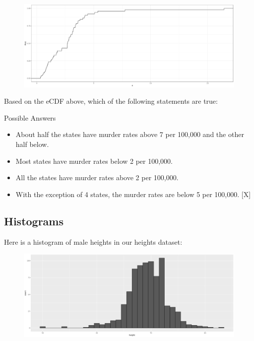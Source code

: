 \documentclass[]{article}
\providecommand{\tightlist}{%
  \setlength{\itemsep}{0pt}\setlength{\parskip}{0pt}}
\begin{document}
\begin{figure}
\centering
\includegraphics{img3.png}
\caption{}
\end{figure}

Based on the eCDF above, which of the following statements are true:

Possible Answers

\begin{itemize}
\tightlist
\item
  About half the states have murder rates above 7 per 100,000 and the
  other half below.
\item
  Most states have murder rates below 2 per 100,000.
\item
  All the states have murder rates above 2 per 100,000.
\item
  With the exception of 4 states, the murder rates are below 5 per
  100,000. {[}X{]}
\end{itemize}

\subsection{\texorpdfstring{\textbf{Histograms}}{Histograms}}\label{histograms}

Here is a histogram of male heights in our heights dataset:

\begin{figure}
\centering
\includegraphics{img4.png}
\caption{}
\end{figure}
\end{document}
